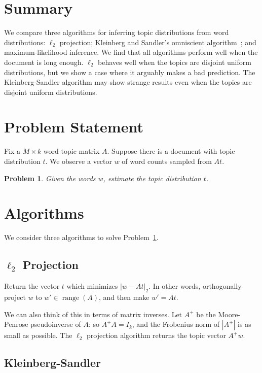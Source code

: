 \documentclass{article}
\DeclareMathOperator{\Range}{range}
\newtheorem{Problem}{Problem}
\begin{document}
\section{Summary}

We compare three algorithms for inferring topic distributions from word distributions:
    \(\ell_2\) projection; Kleinberg and Sandler's omniscient algorithm~\cite{kleinberg2004using}; and maximum-likelihood inference.
We find that all algorithms perform well when the document is long enough.
\(\ell_2\) behaves well when the topics are disjoint uniform distributions, but we show a case where it arguably makes a bad prediction.
The Kleinberg-Sandler algorithm may show strange results even when the topics are disjoint uniform distributions.

\section{Problem Statement}

Fix a \(M \times k\) word-topic matrix \(A\).
Suppose there is a document with topic distribution \(t\).
We observe a vector \(w\) of word counts sampled from \(At\).
\begin{Problem}
    \label{Problem:InferTopics}
    Given the words \(w\), estimate the topic distribution \(t\).
\end{Problem}

\section{Algorithms}

We consider three algorithms to solve Problem~\ref{Problem:InferTopics}.

\subsection{\(\ell_2\) Projection}
\label{Sec:L2Alg}

Return the vector \(t\) which minimizes \(|w - A t|_2\).
In other words, orthogonally project \(w\) to \(w' \in \Range(A)\), and then make \(w' = A t\).

We can also think of this in terms of matrix inverses.
Let \(A^+\) be the Moore-Penrose pseudoinverse of \(A\): so \(A^+A = I_k\), and the Frobenius norm of \(|A^+|\) is as small as possible.
The \(\ell_2\) projection algorithm returns the topic vector \(A^+w\).

\subsection{Kleinberg-Sandler}
\label{Sec:KSAlg}
\end{document}
